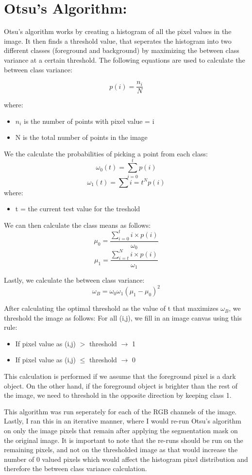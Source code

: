 \documentclass{article}
\begin{document}
\section{Otsu's Algorithm:}
Otsu's algorithm works by creating a histogram of all the pixel values in the image. It then finds a threshold value, that seperates
the histogram into two different classes (foreground and background) by maximizing the between class variance at a certain threshold.
The following equations are used to calculate the between class variance:

\[p(i) = \frac{n_{i}}{N}\]

where:
\begin{itemize}
    \item $n_i$ is the number of points with pixel value = i
    \item N is the total number of points in the image
\end{itemize}

We the calculate the probabilities of picking a point from each class:
\[\omega_0 (t) = \sum_{i=0}^{t} p(i)\]
\[\omega_1 (t) = \sum {i=t}^{N} p(i)\]
where:
\begin{itemize}
    \item t = the current test value for the treshold
\end{itemize}

We can then calculate the class means as follows:
\[\mu_0 = \frac{\sum_{i=0}^{t} i \times p(i)}{\omega_0}\]
\[\mu_1 = \frac{\sum_{i=t}^{N} i \times p(i)}{\omega_1}\]

Lastly, we calculate the between class variance:
\[\omega_B = \omega_0 \omega_1 (\mu_1 - \mu_0)^2\]

After calculating the optimal threshold as the value of t that maximizes $\omega_B$, we threshold the image as follows:
For all (i,j), we fill in an image canvas using this rule:
\begin{itemize}
    \item If pixel value as (i,j) $>$ threshold $\rightarrow$ 1
    \item If pixel value as (i,j) $\leq$ threshold $\rightarrow$ 0
\end{itemize}

This calculation is performed if we assume that the foreground pixel is a dark object. On the other hand, if the foreground
object is brighter than the rest of the image, we need to threshold in the opposite direction by keeping class 1.

This algorithm was run seperately for each of the RGB channels of the image. Lastly, I ran this in an iterative manner, where
I would re-run Otsu's algorithm on only the image pixels that remain after applying the segmentation mask on the original image.
It is important to note that the re-runs should be run on the remaining pixels, and not on the thresholded image as that would increase
the number of 0 valued pixels which would affect the histogram pixel distribution and therefore the between class variance calculation.
\end{document}
